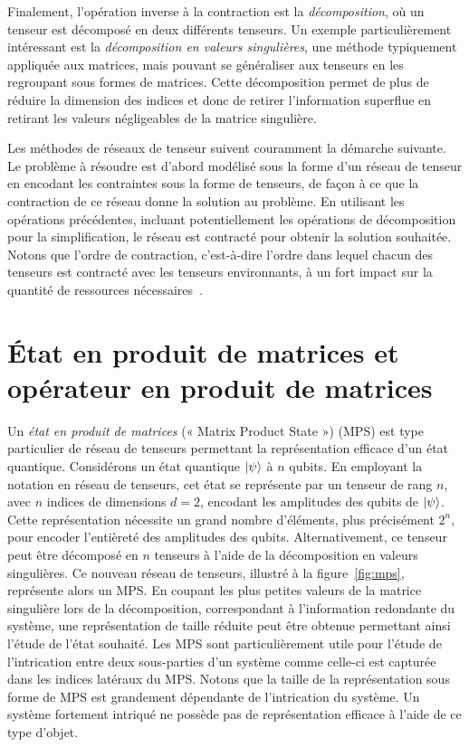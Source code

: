 Finalement, l'opération inverse à la contraction est la \textit{décomposition}, où un tenseur est décomposé en deux différents tenseurs. Un exemple particulièrement intéressant est la \textit{décomposition en valeurs singulières}, une méthode typiquement appliquée aux matrices, mais pouvant se généraliser aux tenseurs en les regroupant sous formes de matrices. Cette décomposition permet de plus de réduire la dimension des indices et donc de retirer l'information superflue en retirant les valeurs négligeables de la matrice singulière.

Les méthodes de réseaux de tenseur suivent couramment la démarche suivante. Le problème à résoudre est d'abord modélisé sous la forme d'un réseau de tenseur en encodant les contraintes sous la forme de tenseurs, de façon à ce que la contraction de ce réseau donne la solution au problème. En utilisant les opérations précédentes, incluant potentiellement les opérations de décomposition pour la simplification, le réseau est contracté pour obtenir la solution souhaitée. Notons que l'ordre de contraction, c'est-à-dire l'ordre dans lequel chacun des tenseurs est contracté avec les tenseurs environnants, à un fort impact sur la quantité de ressources nécessaires~\cite{grayHyperoptimizedTensorNetwork2021}.


\section{État en produit de matrices et opérateur en produit de matrices}
\label{sec:mps-mpo}

Un \textit{état en produit de matrices} (« Matrix Product State ») (MPS) est type particulier de réseau de tenseurs permettant la représentation efficace d'un état quantique. Considérons un état quantique $\ket{\psi}$ à $n$ qubits. En employant la notation en réseau de tenseurs, cet état se représente par un tenseur de rang $n$, avec $n$ indices de dimensions $d=2$, encodant les amplitudes des qubits de $\ket{\psi}$. Cette représentation nécessite un grand nombre d'éléments, plus précisément $2^{n}$, pour encoder l'entièreté des amplitudes des qubits. Alternativement, ce tenseur peut être décomposé en $n$ tenseurs à l'aide de la décomposition en valeurs singulières. Ce nouveau réseau de tenseurs, illustré à la figure~\ref{fig:mps}, représente alors un MPS. En coupant les plus petites valeurs de la matrice singulière lors de la décomposition, correspondant à l'information redondante du système, une représentation de taille réduite peut être obtenue permettant ainsi l'étude de l'état souhaité. Les MPS sont particulièrement utile pour l'étude de l'intrication entre deux sous-parties d'un système comme celle-ci est capturée dans les indices latéraux du MPS. Notons que la taille de la représentation sous forme de MPS est grandement dépendante de l'intrication du système. Un système fortement intriqué ne possède pas de représentation efficace à l'aide de ce type d'objet.

